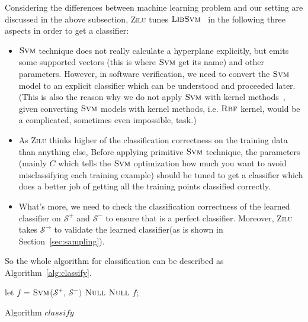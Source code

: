 Considering the differences between machine learning problem and our setting are discussed in the above subsection, 
\textsc{Zilu} tunes $\textsc{LibSvm}$~\cite{chang2011libsvm} in the following three aspects in order to get a classifier: 
\begin{itemize}
\item $\textsc{Svm}$ technique does not really calculate a hyperplane explicitly, 
but emits some supported vectors (this is where $\textsc{Svm}$ get its name) and other parameters.
However, in software verification, we need to convert the $\textsc{Svm}$ model to an explicit classifier which can be understood and proceeded later.
(This is also the reason why we do not apply $\textsc{Svm}$ with kernel methods~\cite{yu2009evolving},
given converting $\textsc{Svm}$ models with kernel methods, i.e. $\textsc{Rbf}$ kernel, would be a complicated, sometimes even impossible, task.)

\item As \textsc{Zilu} thinks higher of the classification correctness on the training data than anything else,
Before applying primitive $\textsc{Svm}$ technique, the parameters 
(mainly $C$ which tells the $\textsc{Svm}$ optimization how much you want to avoid misclassifying each training example)
should be tuned to get a classifier which does a better job of getting all the training points classified correctly.

\item What's more, we need to check the classification correctness of the learned classifier 
on $\mathcal{S}^+$ and $\mathcal{S}^-$ to ensure that is a perfect classifier.
Moreover, \textsc{Zilu} takes $\mathcal{S}^\rightarrow$ to validate the learned classifier(as is shown in Section~\ref{sec:sampling}).
\end{itemize} 

So the whole algorithm for classification can be described as Algorithm~\ref{alg:classify}.

\begin{algorithm}[!h]
\SetAlgoVlined
\Indm
{}
\Indp
    let $f$ = $\textsc{Svm}$($\mathcal{S}^+$, $\mathcal{S}^-)$\;
     {
        \Return $\textsc{Null}$\;
    }
     {
        \Return $\textsc{Null}$\;
    }
    \Return $f$;
\caption{Algorithm $classify$}
\label{alg:classify}
\end{algorithm}

